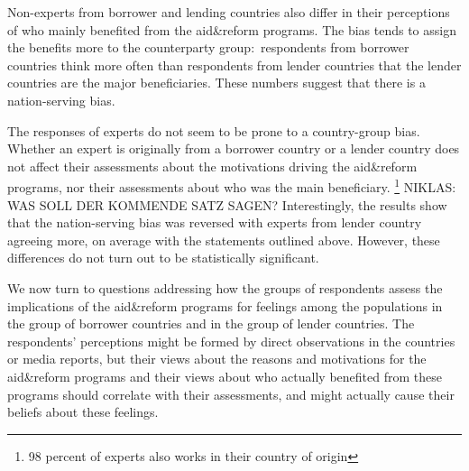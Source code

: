 Non-experts from borrower and lending countries also differ in
their perceptions of who mainly benefited from the aid\&reform programs. The
bias tends to assign the benefits more to the counterparty group:\
respondents from borrower countries think more often than respondents from
lender countries that the lender countries are the major beneficiaries. These numbers
suggest that there is a nation-serving bias. 

The responses of experts do not seem to be prone to a country-group
bias. Whether an expert is originally from a borrower country or a lender
country does not affect their assessments about the
motivations driving the aid\&reform programs, nor their assessments about
who was the main beneficiary. \footnote{98 percent of experts also works in their country of origin } NIKLAS: WAS SOLL DER KOMMENDE SATZ SAGEN? Interestingly, the results show that the
nation-serving bias was reversed with experts from lender country agreeing more, on
average with the statements outlined above. However, these differences do not turn out to be statistically significant.

We now turn to questions addressing how the groups of respondents
assess the implications of the aid\&reform programs for feelings among the
populations in the group of borrower countries and in the group of lender
countries. The respondents' perceptions might be formed by direct
observations in the countries or media reports, but their views about the
reasons and motivations for the aid\&reform programs and their views about
who actually benefited from these programs should correlate with their
assessments, and might actually cause their beliefs about these feelings. 

